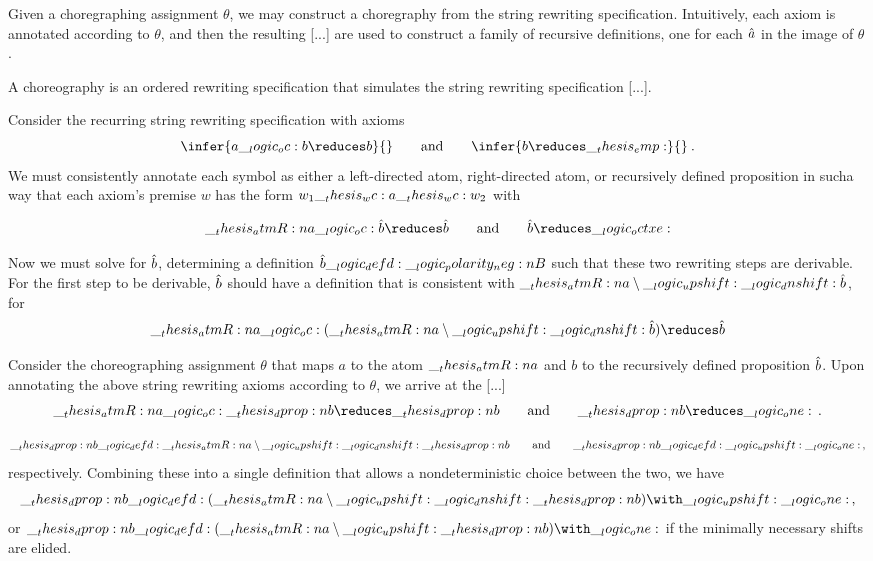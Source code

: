 Given a choregraphing assignment $\theta$, we may construct a choregraphy from the string rewriting specification.
Intuitively, each axiom is annotated according to $\theta$, and then the resulting [...] are used to construct a family of recursive definitions, one for each $\hat{a}$ in the image of $\theta$.

A choreography is an ordered rewriting specification that simulates the string rewriting specification [...].

Consider the recurring string rewriting specification with axioms
\begin{equation*}
  \infer{a \oc b \reduces b}{}
  \qquad\text{and}\qquad
  \infer{b \reduces \emp}{}
  \:.
\end{equation*}
We must consistently annotate each symbol as either a left-directed atom, right-directed atom, or recursively defined proposition in sucha way that each axiom's premise $w$ has the form $w_1 \wc a \wc w_2$ with 

\begin{equation*}
  \atmR{a} \oc \defp{b} \reduces \defp{b}
  \qquad\text{and}\qquad
  \defp{b} \reduces \octxe
\end{equation*}

Now we must solve for $\hat{b}$, determining a definition $\hat{b} \__logic_defd: \__logic_polarity_neg:n {B}$ such that these two rewriting steps are derivable.
For the first step to be derivable, $\hat{b}$ should have a definition that is consistent with $\__thesis_atmR:n {a} \mathbin { \setminus } \__logic_upshift: \__logic_dnshift: \hat{b}$, for 
\begin{equation*}
  \atmR{a} \oc (\atmR{a} \limp \up \dn \defp{b}) \reduces \defp{b}
\end{equation*}

Consider the choreographing assignment $\theta$ that maps $a$ to the atom $\__thesis_atmR:n {a}$ and $b$ to the recursively defined proposition $\hat{b}$.
Upon annotating the above string rewriting axioms according to $\theta$, we arrive at the [...]
\begin{equation*}
  \atmR{a} \oc \dprop{b} \reduces \dprop{b}
  \qquad\text{and}\qquad
  \dprop{b} \reduces \one
  \,.
\end{equation*}

\begin{equation*}
  \__thesis_dprop:n {b} \__logic_defd: \__thesis_atmR:n {a} \mathbin { \setminus } \__logic_upshift: \__logic_dnshift: \__thesis_dprop:n {b}
  \qquad\text{and}\qquad
  \__thesis_dprop:n {b} \__logic_defd: \__logic_upshift: \__logic_one:
  \,,
\end{equation*}
respectively.
Combining these into a single definition that allows a nondeterministic choice between the two, we have
\begin{equation*}
  \dprop{b} \defd (\atmR{a} \limp \up \dn \dprop{b}) \with \up \one
  \,,
\end{equation*}
or $\dprop{b} \defd (\atmR{a} \limp \up \dprop{b}) \with \one$ if the minimally necessary shifts are elided.

